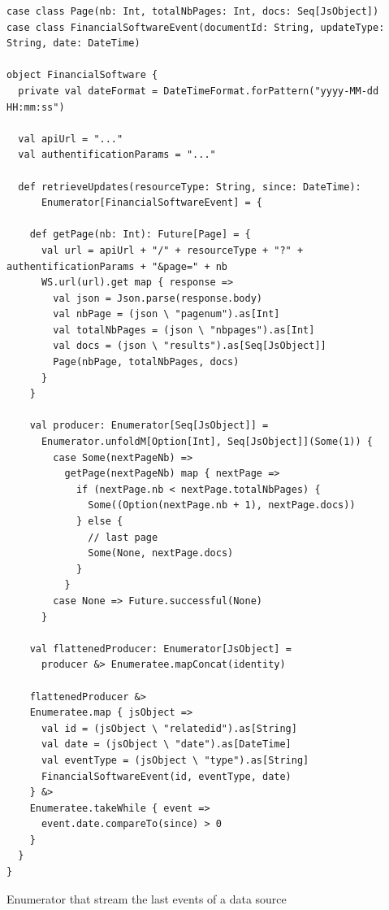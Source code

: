 \begin{listing}
\begin{verbatim}
case class Page(nb: Int, totalNbPages: Int, docs: Seq[JsObject])
case class FinancialSoftwareEvent(documentId: String, updateType: String, date: DateTime)

object FinancialSoftware {
  private val dateFormat = DateTimeFormat.forPattern("yyyy-MM-dd HH:mm:ss")

  val apiUrl = "..."
  val authentificationParams = "..."

  def retrieveUpdates(resourceType: String, since: DateTime): 
      Enumerator[FinancialSoftwareEvent] = {

    def getPage(nb: Int): Future[Page] = {
      val url = apiUrl + "/" + resourceType + "?" + authentificationParams + "&page=" + nb
      WS.url(url).get map { response =>
        val json = Json.parse(response.body)
        val nbPage = (json \ "pagenum").as[Int]
        val totalNbPages = (json \ "nbpages").as[Int]
        val docs = (json \ "results").as[Seq[JsObject]]
        Page(nbPage, totalNbPages, docs)
      }
    }

    val producer: Enumerator[Seq[JsObject]] = 
      Enumerator.unfoldM[Option[Int], Seq[JsObject]](Some(1)) {
        case Some(nextPageNb) =>
          getPage(nextPageNb) map { nextPage =>
            if (nextPage.nb < nextPage.totalNbPages) {
              Some((Option(nextPage.nb + 1), nextPage.docs))
            } else {
              // last page
              Some(None, nextPage.docs)
            }
          }
        case None => Future.successful(None)
      }

    val flattenedProducer: Enumerator[JsObject] = 
      producer &> Enumeratee.mapConcat(identity)

    flattenedProducer &>
    Enumeratee.map { jsObject =>
      val id = (jsObject \ "relatedid").as[String]
      val date = (jsObject \ "date").as[DateTime]
      val eventType = (jsObject \ "type").as[String]
      FinancialSoftwareEvent(id, eventType, date)
    } &>
    Enumeratee.takeWhile { event =>
      event.date.compareTo(since) > 0
    }
  }
}
\end{verbatim}
\caption{Enumerator that stream the last events of a data source}
\label{lst:enumfetchsellsy}
\end{listing}

